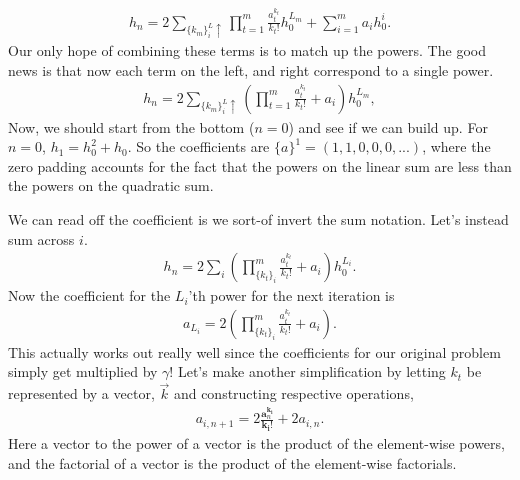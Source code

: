 \documentclass[../../main.tex]{subfiles}
\begin{document}
\begin{appendices}
			\begin{align}
				h_n = 2\sum_{\{k_m\}_i^L\uparrow} \prod_{t=1}^m \frac{a_t^{k_t}}{k_t!} h_0^{L_m} + \sum_{i=1}^m a_i h_0^i.
			\end{align}
			Our only hope of combining these terms is to match up the powers. The good news is that now each term on the left, and right correspond to a single power.
			\begin{align}
				h_n = 2\sum_{\{k_m\}_i^L\uparrow} \left(\prod_{t=1}^m \frac{a_t^{k_t}}{k_t!} + a_i \right) h_0^{L_m},
			\end{align}
			Now, we should start from the bottom ($n=0$) and see if we can build up. For $n=0$, $h_{1}=h_0^2+h_0$. So the coefficients are $\{a\}^1 = (1, 1, 0, 0, 0, ...)$, where the zero padding accounts for the fact that the powers on the linear sum are less than the powers on the quadratic sum.

			We can read off the coefficient is we sort-of invert the sum notation. Let's instead sum across $i$.
			\begin{align}
				h_n = 2\sum_{i} \left(\prod_{\{k_t\}_i}^m \frac{a_t^{k_t}}{k_t!} + a_i \right) h_0^{L_i}.
			\end{align}
			Now the coefficient for the $L_i$'th power for the next iteration is
			\begin{align}
				a_{L_i} = 2\left(\prod_{\{k_t\}_i}^m \frac{a_t^{k_t}}{k_t!} + a_i \right).
			\end{align}
			This actually works out really well since the coefficients for our original problem simply get multiplied by $\gamma$! Let's make another simplification by letting $k_t$ be represented by a vector, $\vec k$ and constructing respective operations,
			\begin{align}
				a_{i, n+1} = 2 \frac{\boldsymbol{a}_n^\boldsymbol{k_i}}{\boldsymbol{k_i}!} + 2a_{i, n}.
			\end{align}
			Here a vector to the power of a vector is the product of the element-wise powers, and the factorial of a vector is the product of the element-wise factorials.
		\end{appendices}
\end{document}
